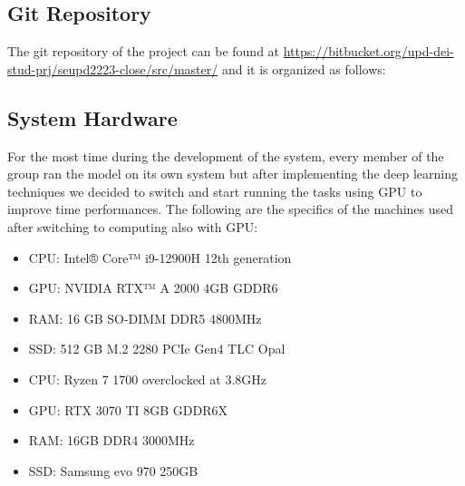 \newpage
\subsection{Git Repository}
The git repository of the project can be found at
\url{https://bitbucket.org/upd-dei-stud-prj/seupd2223-close/src/master/} and it is organized as follows:


\subsection{System Hardware}
For the most time during the development of the system, every member of the group ran the model on its own system but after implementing the deep learning techniques we decided to switch and start running the tasks using GPU to improve time performances.
The following are the specifics of the machines used after switching to computing also with GPU:
\begin{itemize}
	\item CPU: Intel® Core™ i9-12900H 12th generation
	\item GPU: NVIDIA RTX™ A 2000 4GB GDDR6
	\item RAM: 16 GB SO-DIMM DDR5 4800MHz
	\item SSD: 512 GB M.2 2280 PCIe Gen4 TLC Opal
\end{itemize}
\begin{itemize}
	\item CPU: Ryzen 7 1700 overclocked at 3.8GHz
	\item GPU: RTX 3070 TI 8GB GDDR6X
	\item RAM: 16GB  DDR4 3000MHz
	\item SSD: Samsung evo 970 250GB
\end{itemize}


